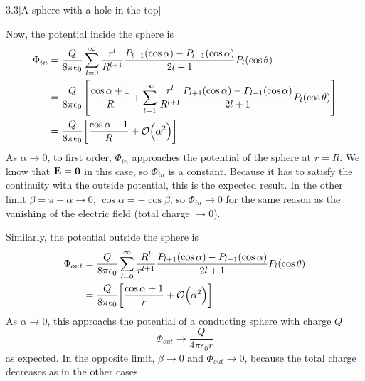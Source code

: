 \documentclass[12pt]{article}
\begin{document}
\begin{problem}{3.3}[A sphere with a hole in the top]
\begin{solution}
Now, the potential inside the sphere is
\begin{align}
    \Phi_{in}
    &=\frac{Q}{8\pi\epsilon_0}\sum_{l=0}^\infty\frac{r^l}{R^{l+1}}\frac{P_{l+1}(\cos\alpha)-P_{l-1}(\cos\alpha)}{2l+1}P_l(\cos\theta)\notag\\
    &=\frac{Q}{8\pi\epsilon_0}\qty[\frac{\cos\alpha+1}{R}
    +\sum_{l=1}^\infty\frac{r^l}{R^{l+1}}\frac{P_{l+1}(\cos\alpha)-P_{l-1}(\cos\alpha)}{2l+1}P_l(\cos\theta)
    ]\notag\\
    &=\frac{Q}{8\pi\epsilon_0}\qty[\frac{\cos\alpha+1}{R}+\order{\alpha^2}]
\end{align}
As $\alpha\to 0$, to first order, $\Phi_{in}$ approaches the potential of the 
sphere at $r=R$. We know that $\vb{E}=\vb{0}$ in this case, so $\Phi_{in}$ is a 
constant. Because it has to satisfy the continuity with the outside potential, 
this is the expected result. In the other limit $\beta=\pi-\alpha\to 0$,
$\cos\alpha=-\cos\beta$, so $\Phi_{in}\to 0$ for the same reason as the 
vanishing of the electric field (total charge $\to 0$).

Similarly, the potential outside the sphere is
\begin{align}
    \Phi_{out}
    &=\frac{Q}{8\pi\epsilon_0}\sum_{l=0}^\infty
        \frac{R^l}{r^{l+1}}\frac{P_{l+1}(\cos\alpha)-P_{l-1}(\cos\alpha)}{2l+1}
            P_l(\cos\theta)\notag\\
    &=\frac{Q}{8\pi\epsilon_0}\qty[\frac{\cos\alpha+1}{r}
        +\order{\alpha^2}
    ]
\end{align}
As $\alpha\to 0$, this approachs the potential of a conducting sphere with
charge $Q$
\begin{equation}
    \Phi_{out}\to\frac{Q}{4\pi\epsilon_0 r} 
\end{equation}
as expected. In the opposite limit, $\beta\to 0$ and $\Phi_{out}\to 0$, because
the total charge decreases as in the other cases.
\end{solution}
\end{problem}
\end{document}
